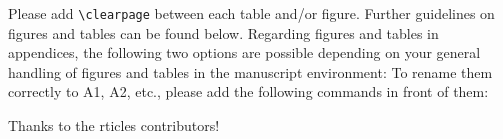 \documentclass[gc, manuscript]{copernicus}
\begin{document}
Please add \texttt{\textbackslash{}clearpage} between each table and/or
figure. Further guidelines on figures and tables can be found below.
Regarding figures and tables in appendices, the following two options
are possible depending on your general handling of figures and tables in
the manuscript environment: To rename them correctly to A1, A2, etc.,
please add the following commands in front of them:
\noappendix




\begin{acknowledgements}
Thanks to the rticles contributors!
\end{acknowledgements}







\end{document}
